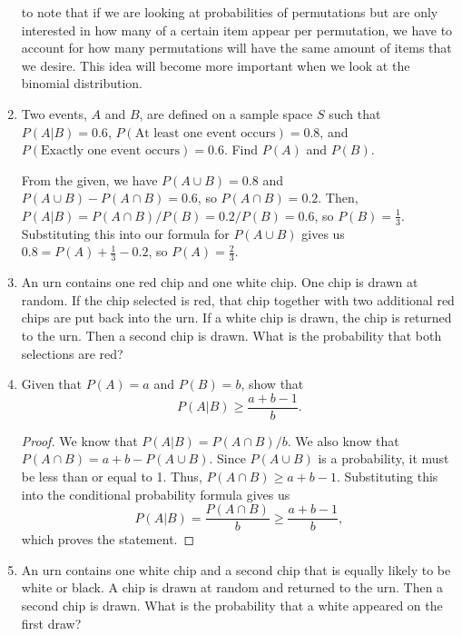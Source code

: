 \documentclass{article}
\begin{document}
\begin{enumerate}
{\begin{minipage}[t]{.76\textwidth}
        to note that if we are looking at probabilities of permutations but are only interested in how many of a certain item appear per permutation, we have to account for how many permutations will 
        have the same amount of items that we desire. This idea will become more important when we look at the binomial distribution. 
    \end{minipage}%
    }
    \item Two events, \(A\) and \(B\), are defined on a sample space \(S\) such that \(P(A|B) = 0.6\), \(P(\text{At least one event occurs}) = 0.8\), and \(P(\text{Exactly one event occurs})=0.6\). 
    Find \(P(A)\) and \(P(B)\).\begin{solution}
        From the given, we have \(P(A\cup{}B) = 0.8 \) and \(P(A\cup{}B) - P(A\cap{}B) = 0.6\), so \(P(A\cap{}B) = 0.2\). Then, \(P(A|B) = P(A\cap{}B)/P(B) = 0.2/P(B) = 0.6\), so \(P(B) = \frac{1}{3}\). 
        Substituting this into our formula for \(P(A\cup{}B)\) gives us \(0.8 = P(A) + \frac{1}{3} - 0.2 \), so \(P(A) = \frac{2}{3}\). 
    \end{solution}
    \item An urn contains one red chip and one white chip. One chip is drawn at random. If the chip selected is red, that chip together with two additional red chips are put back into the urn. 
    If a white chip is drawn, the chip is returned to the urn. Then a second chip is drawn. What is the probability that both selections are red?\begin{solution}
        
    \end{solution}
    \item Given that \(P(A) = a\) and \(P(B) = b\), show that \[
        P(A|B) \geq \frac{a+b-1}{b}.  
    \]\begin{proof}
        We know that \(P(A|B) = P(A\cap{}B)/b\). We also know that \(P(A\cap{}B) = a + b - P(A\cup{}B)\). Since \(P(A\cup{}B)\) is a probability, it must be less than or equal to 1. Thus, \(P(A\cap{}B) \geq a + b - 1\). 
        Substituting this into the conditional probability formula gives us\[
            P(A|B) = \frac{P(A\cap{}B)}{b} \geq \frac{a+b-1}{b}, 
        \] which proves the statement.
    \end{proof}
    \item An urn contains one white chip and a second chip that is equally likely to be white or black. A chip is drawn at random and returned to the urn. Then a second chip is drawn. What is the probability that a
    white appeared on the first draw?\begin{solution}
        

\end{solution}
\end{enumerate}
\end{document}
